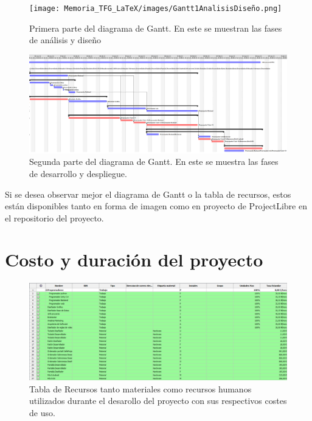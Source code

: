 \begin{figure}[H]
    \centering
    \texttt{[image: Memoria\_TFG\_LaTeX/images/Gantt1AnalisisDiseño.png]}
    \caption{Primera parte del diagrama de Gantt. En este se muestran las fases de análisis y diseño}
    \label{fig:ganttAnalisisDiseño}
\end{figure}

\begin{figure}[H]
    \centering
    \includegraphics[width=1\textwidth]{Memoria_TFG_LaTeX/images/Gantt2DesarrolloDespliegue.png}
    \caption{Segunda parte del diagrama de Gantt. En este se muestra las fases de desarrollo y despliegue.}
    \label{fig:ganttDesarrolloDespliegue}
\end{figure}

Si se desea observar mejor el diagrama de Gantt o la tabla de recursos, estos están disponibles tanto en forma de imagen como en proyecto de ProjectLibre en el repositorio del proyecto.

\section{Costo y duración del proyecto}

\begin{figure}[H]
    \centering
    \includegraphics[width=1\textwidth]{Memoria_TFG_LaTeX/images/Recursos.png}
    \caption{Tabla de Recursos tanto materiales como recursos humanos utilizados durante el desarollo del proyecto con sus respectivos costes de uso.}
    \label{fig:tablaRecursos}
\end{figure}

